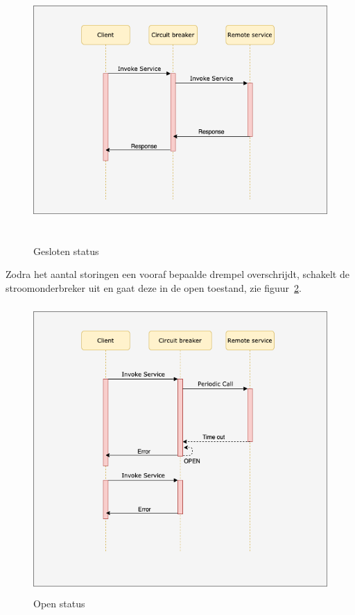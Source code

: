 \begin{figure}[!htb]
    \centering
    \includegraphics[height=10cm]{closed.png}
    \caption{Gesloten status \label{gesloten}}
\end{figure}

Zodra het aantal storingen een vooraf bepaalde drempel overschrijdt, schakelt de stroomonderbreker uit en gaat deze in de open toestand, zie figuur~\ref{open}.
\begin{figure}[!htb]
    \centering
    \includegraphics[height=11cm]{open.png}
    \caption{Open status \label{open}}
\end{figure}


